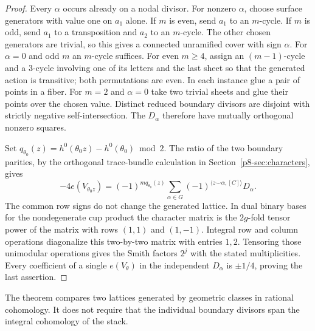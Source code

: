 \begin{proof}
Every $\alpha$ occurs already on a nodal divisor. For nonzero
$\alpha$, choose surface generators with value one on $a_1$ alone.
If $m$ is even, send $a_1$ to an $m$-cycle. If $m$ is odd, send
$a_1$ to a transposition and $a_2$ to an $m$-cycle. The other chosen
generators are trivial, so this gives a connected unramified cover
with sign $\alpha$. For $\alpha=0$ and odd $m$ an $m$-cycle suffices.
For even $m\ge4$, assign an $(m-1)$-cycle and a $3$-cycle involving
one of its letters and the last sheet so that the generated action
is transitive; both permutations are even. In each instance glue a
pair of points in a fiber. For $m=2$ and $\alpha=0$ take two trivial
sheets and glue their points over the chosen value. Distinct reduced
boundary divisors are disjoint with strictly negative self-intersection.
The $D_\alpha$ therefore have mutually orthogonal nonzero squares.

Set $q_{\theta_0}(z)=h^0(\theta_0 z)-h^0(\theta_0)\bmod2$.
The ratio of the two boundary parities, by the orthogonal trace-bundle
calculation in Section~\ref{p8-sec:characters}, gives
\[
 -4e(V_{\theta_0 z})
    =(-1)^{m q_{\theta_0}(z)}
       \sum_{\alpha\in G}
          (-1)^{\langle z\smile\alpha,[C]\rangle}D_\alpha .
\]
The common row signs do not change the generated lattice. In dual
binary bases for the nondegenerate cup product the character matrix
is the $2g$-fold tensor power of the matrix with rows $(1,1)$ and
$(1,-1)$. Integral row and column operations diagonalize this
two-by-two matrix with entries $1,2$. Tensoring those unimodular
operations gives the Smith factors $2^j$ with the stated
multiplicities. Every coefficient of a single $e(V_\theta)$ in the
independent $D_\alpha$ is $\pm1/4$, proving the last assertion.
\end{proof}
The theorem compares two lattices generated by geometric classes in
rational cohomology. It does not require that the individual
boundary divisors span the integral cohomology of the stack.
